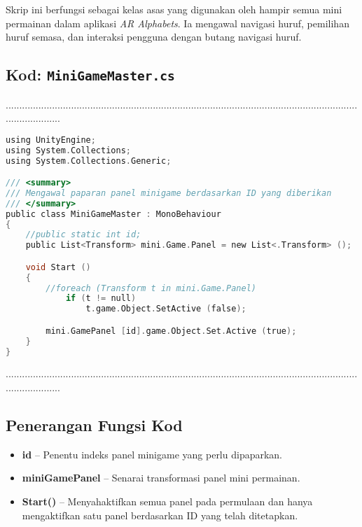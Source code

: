 \begin{itemize}
\begin{itemize}
\begin{itemize}
\begin{itemize}
\begin{itemize}
\begin{itemize}
\begin{itemize}
\begin{itemize}
\begin{flushleft}
\bigskip

Skrip ini berfungsi sebagai kelas asas yang digunakan oleh hampir semua mini permainan dalam aplikasi \textit{AR Alphabets}. Ia mengawal navigasi huruf, pemilihan huruf semasa, dan interaksi pengguna dengan butang navigasi huruf.

\clearpage

\subsection*{Kod: \texttt{MiniGameMaster.cs}}
.....................................................................................................................................................
\begin{lstlisting}[language=C,caption={Kod Skrip MiniGameMaster untuk Menetapkan Panel Permainan},label={lst:minigame-script}]
using UnityEngine;
using System.Collections;
using System.Collections.Generic;

/// <summary>
/// Mengawal paparan panel minigame berdasarkan ID yang diberikan
/// </summary>
public class MiniGameMaster : MonoBehaviour
{
    //public static int id;
    public List<Transform> mini.Game.Panel = new List<.Transform> ();

    void Start ()
    {
        //foreach (Transform t in mini.Game.Panel)
            if (t != null)
                t.game.Object.SetActive (false);

        mini.GamePanel [id].game.Object.Set.Active (true);
    }
}
\end{lstlisting}
.....................................................................................................................................................
\subsection*{Penerangan Fungsi Kod}

\begin{itemize}
  \item \textbf{id} -- Penentu indeks panel minigame yang perlu dipaparkan.
  \item \textbf{miniGamePanel} -- Senarai transformasi panel mini permainan.
  \item \textbf{Start()} -- Menyahaktifkan semua panel pada permulaan dan hanya mengaktifkan satu panel berdasarkan ID yang telah ditetapkan.
\end{itemize}

\bigskip


\end{flushleft}
\end{itemize}
\end{itemize}
\end{itemize}
\end{itemize}
\end{itemize}
\end{itemize}
\end{itemize}
\end{itemize}
